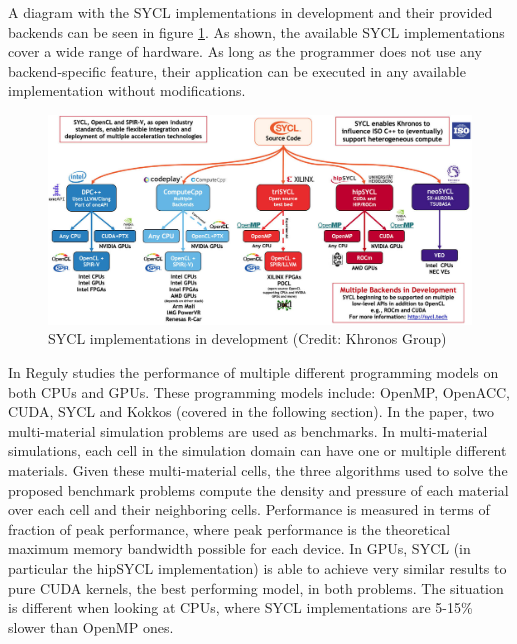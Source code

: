 A diagram with the SYCL implementations in development and their provided backends can be seen in figure \ref{fig:sycl-implementations}. As shown, the available SYCL implementations cover a wide range of hardware. As long as the programmer does not use any backend-specific feature, their application can be executed in any available implementation without modifications.

\begin{figure}[ht]
    \centering
    \includegraphics[width=\textwidth]{img/sycl-implementations.png}
    \captionsetup{justification=centering}
    \caption{SYCL implementations in development (Credit: Khronos Group)}
    \label{fig:sycl-implementations}
\end{figure}

In \cite{performance_portability_multimaterial_kernels} Reguly studies the performance of multiple different programming models on both CPUs and GPUs. These programming models include: OpenMP, OpenACC, CUDA, SYCL and Kokkos (covered in the following section). In the paper, two multi-material simulation problems are used as benchmarks. In multi-material simulations, each cell in the simulation domain can have one or multiple different materials. Given these multi-material cells, the three algorithms used to solve the proposed benchmark problems compute the density and pressure of each material over each cell and their neighboring cells. Performance is measured in terms of fraction of peak performance, where peak performance is the theoretical maximum memory bandwidth possible for each device. In GPUs, SYCL (in particular the hipSYCL implementation) is able to achieve very similar results to pure CUDA kernels, the best performing model, in both problems. The situation is different when looking at CPUs, where SYCL implementations are 5-15\% slower than OpenMP ones.

